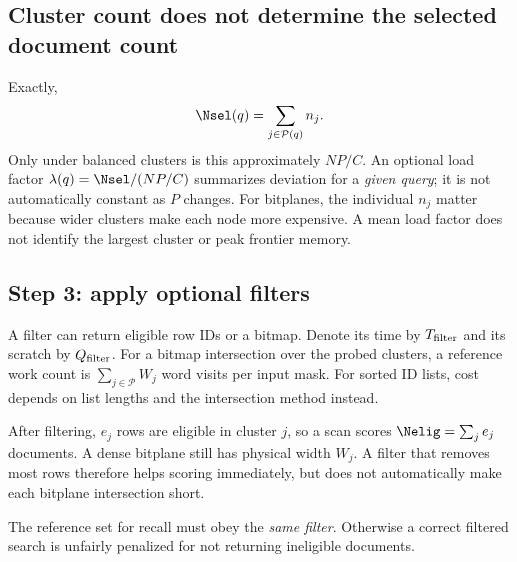 \subsection{Cluster count does not determine the selected document count}
Exactly,
\begin{equation}
\Nsel(q)=\sum_{j\in\mathcal P(q)}n_j.
\label{eq:selected}
\end{equation}
Only under balanced clusters is this approximately $NP/C$. An optional load factor
$\lambda(q)=\Nsel/(NP/C)$ summarizes deviation for a \emph{given query}; it is not automatically
constant as $P$ changes. For bitplanes, the individual $n_j$ matter because wider clusters
make each node more expensive. A mean load factor does not identify the largest cluster or
peak frontier memory.

\subsection{Step 3: apply optional filters}
A filter can return eligible row IDs or a bitmap. Denote its time by $T_{\rm filter}$ and
its scratch by $Q_{\rm filter}$. For a bitmap intersection over the probed clusters, a reference
work count is $\sum_{j\in\mathcal P}W_j$ word visits per input mask. For sorted ID lists, cost
depends on list lengths and the intersection method instead.

After filtering, $e_j$ rows are eligible in cluster $j$, so a scan scores
$\Nelig=\sum_j e_j$ documents. A dense bitplane still has physical width $W_j$. A filter that
removes most rows therefore helps scoring immediately, but does not automatically make each
bitplane intersection short.

The reference set for recall must obey the \emph{same filter}. Otherwise a correct filtered
search is unfairly penalized for not returning ineligible documents.

